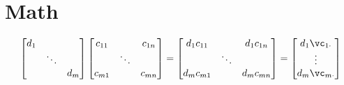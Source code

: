 \documentclass{article}
\newcounter{ct}
\begin{document}
    \section{Math}
    \begin{equation}
        \begin{bmatrix}
            d_1 & & \\
            & \ddots & \\
            & & d_m
        \end{bmatrix}
        \begin{bmatrix}
            c_{11} & & c_{1n} \\
            & \ddots & \\
            c_{m1} & & c_{mn}
        \end{bmatrix}
        =
        \begin{bmatrix}
            d_1 c_{11} & & d_1 c_{1n} \\
            & \ddots & \\
            d_m c_{m1} & & d_m c_{mn}
        \end{bmatrix}
        =
    \begin{bmatrix}
        d_1 \vc_{1\cdot}\\
         \vdots  \\
        d_m \vc_{m\cdot}
    \end{bmatrix}
    \end{equation}
\end{document}
